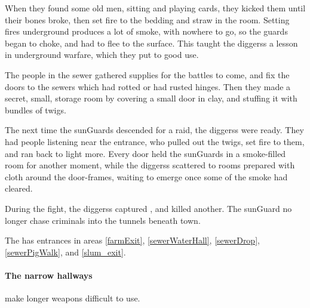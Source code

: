 \begin{multicols}{2}
\begin{exampletext}
  When they found some old men, sitting and playing cards, they kicked them until their bones broke, then set fire to the bedding and straw in the room.
  Setting fires underground produces a lot of smoke, with nowhere to go, so the guards began to choke, and had to flee to the surface.
  This taught the \glspl{diggers} a lesson in underground warfare, which they put to good use.

  The people in the sewer gathered supplies for the battles to come, and fix the doors to the sewers which had rotted or had rusted hinges.
  Then they made a secret, small, storage room by covering a small door in clay, and stuffing it with bundles of twigs.

  The next time the \glspl{sunGuard} descended for a raid, the \glspl{diggers} were ready.
  They had people listening near the entrance, who pulled out the twigs, set fire to them, and ran back to light more.
  Every door held the \glspl{sunGuard} in a smoke-filled room for another moment, while the \glspl{diggers} scattered to rooms prepared with cloth around the door-frames, waiting to emerge once some of the smoke had cleared.

  During the fight, the \glspl{diggers} captured , and killed another.
  The \gls{sunGuard} no longer chase criminals into the tunnels beneath \gls{town}.
\end{exampletext}

The  has entrances in \glspl{area} \ref{farmExit}, \ref{sewerWaterHall}, \ref{sewerDrop}, \ref{sewerPigWalk}, and \ref{slum_exit}.

\paragraph{The narrow hallways}
make longer weapons difficult to use.%



\end{multicols}
